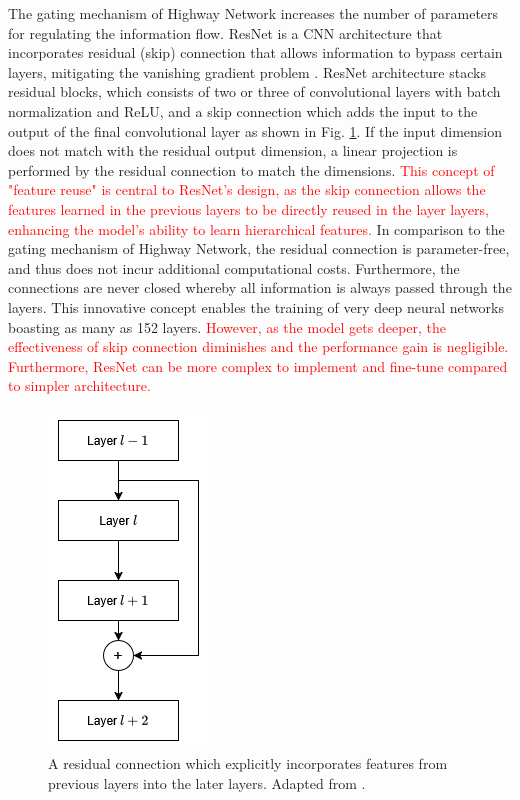 \documentclass[preprint,12pt]{elsarticle}
\begin{document}
The gating mechanism of Highway Network increases the number of parameters for regulating the information flow. ResNet is a CNN architecture that incorporates residual (skip) connection that allows information to bypass certain layers, mitigating the vanishing gradient problem \citep{he_deep_2015}. ResNet architecture stacks residual blocks, which consists of two or three of convolutional layers with batch normalization and ReLU, and a skip connection which adds the input to the output of the final convolutional layer as shown in Fig. \ref{fig_deep_sv_learning_cnn_resnet}. If the input dimension does not match with the residual output dimension, a linear projection is performed by the residual connection to match the dimensions. \textcolor{red}{This concept of "feature reuse" is central to ResNet's design, as the skip connection allows the features learned in the previous layers to be directly reused in the layer layers, enhancing the model's ability to learn hierarchical features.} In comparison to the gating mechanism of Highway Network, the residual connection is parameter-free, and thus does not incur additional computational costs. Furthermore, the connections are never closed whereby all information is always passed through the layers. This innovative concept enables the training of very deep neural networks boasting as many as 152 layers. \textcolor{red}{However, as the model gets deeper, the effectiveness of skip connection diminishes and the performance gain is negligible. Furthermore, ResNet can be more complex to implement and fine-tune compared to simpler architecture.}

\begin{figure}[h!]
    \centering
    \includegraphics[scale=0.5]{fig_deep_sv_learning_cnn_resnet.png}
    \caption{A residual connection which explicitly incorporates features from previous layers into the later layers. Adapted from \citep{he_deep_2015}.}
    \label{fig_deep_sv_learning_cnn_resnet}
\end{figure}
\end{document}
